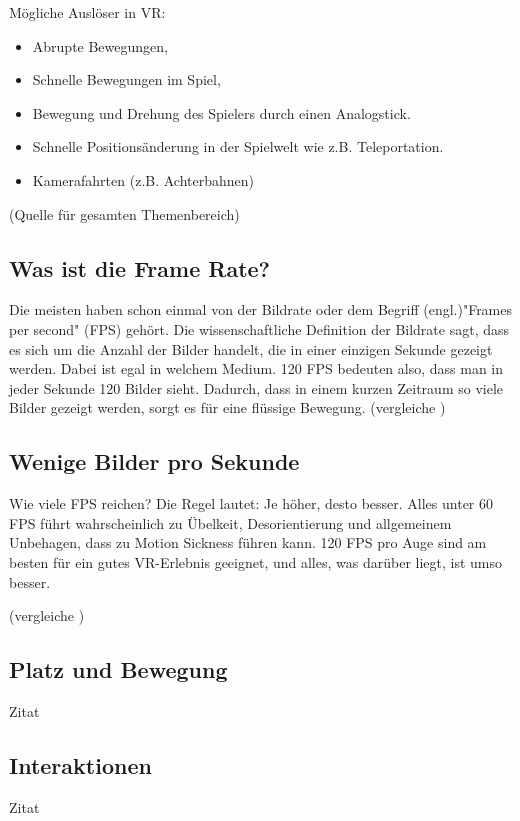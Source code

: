 \vspace{1cm}
Mögliche Auslöser in VR:
\begin{itemize}
	\item Abrupte Bewegungen,
	\item Schnelle Bewegungen im Spiel,
	\item Bewegung und Drehung des Spielers durch einen Analogstick.
	\item Schnelle Positionsänderung in der Spielwelt wie z.B. Teleportation.
	\item Kamerafahrten (z.B. Achterbahnen)
\end{itemize}

(Quelle für gesamten Themenbereich)
\cite{_motionsickness}
\cite{_vr_quovadis}


\subsection{Was ist die Frame Rate?}
Die meisten haben schon einmal von der Bildrate oder dem Begriff (engl.)"Frames per second" (FPS) gehört. Die wissenschaftliche Definition der Bildrate sagt, dass es sich um die Anzahl der Bilder handelt, die in einer einzigen Sekunde gezeigt werden. Dabei ist egal in welchem Medium. 120 FPS bedeuten also, dass man in jeder Sekunde 120 Bilder sieht. Dadurch, dass in einem kurzen Zeitraum so viele Bilder gezeigt werden, sorgt es für eine flüssige Bewegung.
(vergleiche \cite{_vr_linde})

\subsection{Wenige Bilder pro Sekunde}
Wie viele FPS reichen?
Die Regel lautet: Je höher, desto besser. Alles unter 60 FPS führt wahrscheinlich zu Übelkeit, Desorientierung und allgemeinem Unbehagen, dass zu Motion Sickness führen kann. 120 FPS pro Auge sind am besten für ein gutes VR-Erlebnis geeignet, und alles, was darüber liegt, ist umso besser.

(vergleiche \cite{_vr_linde})

\subsection{Platz und Bewegung}
Zitat

\subsection{Interaktionen}
Zitat